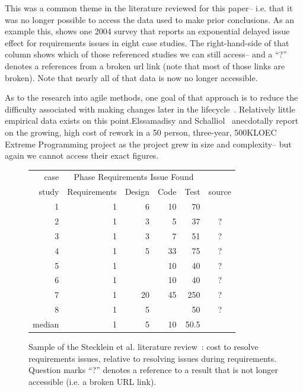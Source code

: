 This was a common theme in the literature reviewed for this paper-- i.e.  that  it was no longer possible to access
the data used to make prior conclusions.
As an example this,  shows one 2004 survey that reports an exponential delayed issue  effect for 
requirements issues in eight case studies. The right-hand-side of that column shows which of those referenced studies
we can still access-- and a ``?'' denotes a references from a broken url link (note that most
of those links are broken). Note that nearly all of that data is now no longer accessible.


As to the research into agile methods, one goal of that approach
is to reduce the difficulty associated with making changes later in the lifecycle~\cite{beck00}. Relatively little empirical data exists on this point.Elssamadisy and Schalliol~\cite{Elssamadisy02} anecdotally report on the growing, high cost of rework in a 50 person, three-year, 500KLOEC Extreme Programming project as the project grew in size and complexity-- but again we cannot access their 
exact figures.


 


 \begin{figure}
{\small
\begin{center}
\begin{tabular}{r|rrrr|c}
 case& \multicolumn{4}{c|}{Phase Requirements Issue Found }&  \\
 study               &Requirements & Design & Code&  Test& source\\\hline
1 & 1& 6& 10& 70&~\cite{Boehm81}\\  
2& 1 &3& 5& 37&?\\ 
3&  1 &3& 7& 51& ?\\ 
4& 1& 5 &33 &75& ? \\
5& 1  &    & 10 & 40& ?\\ 
6& 1   &    & 10 &  40& ?\\
7&  1 & 20 & 45 & 250& ?\\  
8&  1  &   5 &      & 50& ? \\\hline
median           & 1 &  5  & 10   & 50.5 
\end{tabular}
\end{center}}
\caption{Sample of the Stecklein et al. literature review~\cite{steck04}:
cost to resolve requirements issues, relative to resolving issues during requirements.
Question marks ``?'' denotes a reference to
a result that is not longer accessible (i.e. a broken URL link).}\label{fig:steck}
\end{figure}



